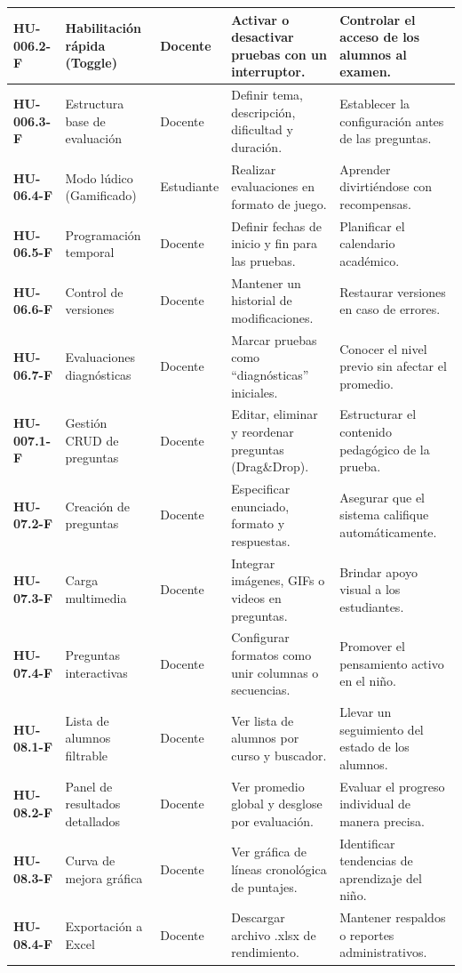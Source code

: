\begin{small}
\begin{longtable}{|>{\bfseries}p{2.0cm}|p{2.5cm}|p{1.7cm}|p{3.7cm}|p{3.5cm}|}
HU-006.2-F & Habilitación rápida (Toggle) & Docente & Activar o desactivar pruebas con un interruptor. & Controlar el acceso de los alumnos al examen. \\\hline
HU-006.3-F & Estructura base de evaluación & Docente & Definir tema, descripción, dificultad y duración. & Establecer la configuración antes de las preguntas. \\\hline
HU-06.4-F & Modo lúdico (Gamificado) & Estudiante & Realizar evaluaciones en formato de juego. & Aprender divirtiéndose con recompensas. \\\hline
HU-06.5-F & Programación temporal & Docente & Definir fechas de inicio y fin para las pruebas. & Planificar el calendario académico. \\\hline
HU-06.6-F & Control de versiones & Docente & Mantener un historial de modificaciones. & Restaurar versiones en caso de errores. \\\hline
HU-06.7-F & Evaluaciones diagnósticas & Docente & Marcar pruebas como ``diagnósticas'' iniciales. & Conocer el nivel previo sin afectar el promedio. \\\hline
HU-007.1-F & Gestión CRUD de preguntas & Docente & Editar, eliminar y reordenar preguntas (Drag\&Drop). & Estructurar el contenido pedagógico de la prueba. \\\hline
HU-07.2-F & Creación de preguntas & Docente & Especificar enunciado, formato y respuestas. & Asegurar que el sistema califique automáticamente. \\\hline
HU-07.3-F & Carga multimedia & Docente & Integrar imágenes, GIFs o videos en preguntas. & Brindar apoyo visual a los estudiantes. \\\hline
HU-07.4-F & Preguntas interactivas & Docente & Configurar formatos como unir columnas o secuencias. & Promover el pensamiento activo en el niño. \\\hline
HU-08.1-F & Lista de alumnos filtrable & Docente & Ver lista de alumnos por curso y buscador. & Llevar un seguimiento del estado de los alumnos. \\\hline
HU-08.2-F & Panel de resultados detallados & Docente & Ver promedio global y desglose por evaluación. & Evaluar el progreso individual de manera precisa. \\\hline
HU-08.3-F & Curva de mejora gráfica & Docente & Ver gráfica de líneas cronológica de puntajes. & Identificar tendencias de aprendizaje del niño. \\\hline
HU-08.4-F & Exportación a Excel & Docente & Descargar archivo .xlsx de rendimiento. & Mantener respaldos o reportes administrativos. \\\hline

\end{longtable}
\end{small}
